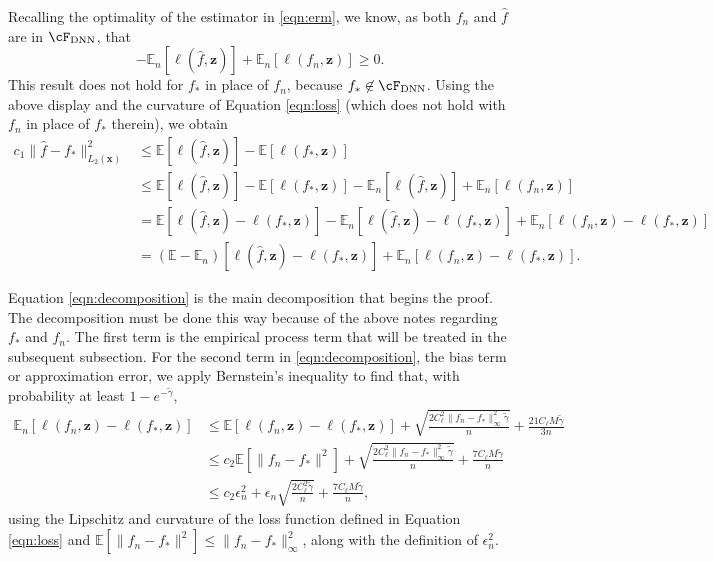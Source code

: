 \documentclass[11pt]{article}
\numberwithin{equation}{section}
\theoremstyle{definition}
\newcommand{\E}{\mathbb{E}}
\newcommand{\bz}{\bm{z}}
\newcommand{\bx}{\bm{x}}
\newcommand{\gt}{\tilde{\gamma}}
\begin{document}
\begin{appendices}
	
	Recalling the optimality of the estimator in \eqref{eqn:erm}, we know, as both $f_n$ and $\hat{f}$ are in $\cF_{\rm DNN}$, that
	\[
		 - \E_n [\ell(\hat{f}, \bz)] + \E_n[ \ell(f_n, \bz)]  \geq 0.
	\]
	This result does not hold for $f_*$ in place of $f_n$, because $f_* \not\in \cF_{\rm DNN}$. Using the above display and the curvature of Equation \eqref{eqn:loss} (which does not hold with $f_n$ in place of $f_*$ therein), we obtain
	\begin{align}
		c_1 \| \hat{f} - f_* \|_{L_2(\bx)}^2 & \leq \E [\ell(\hat{f}, \bz)] - \E [\ell(f_*, \bz)] \nonumber \\
		& \leq \E [\ell(\hat{f}, \bz)] - \E [\ell(f_*, \bz)] - \E_n [\ell(\hat{f}, \bz)] + \E_n [\ell(f_n, \bz)] \nonumber \\
		& = \E \left[ \ell(\hat{f}, \bz) - \ell(f_*, \bz) \right] - \E_n \left[\ell(\hat{f}, \bz) -  \ell(f_*, \bz) \right] + \E_n \left[ \ell(f_n, \bz) - \ell(f_*, \bz) \right] \nonumber \\
		& = \left( \E - \E_n \right)\left[ \ell(\hat{f}, \bz) - \ell(f_*, \bz) \right] + \E_n \left[ \ell(f_n, \bz) - \ell(f_*, \bz) \right]. \label{eqn:decomposition}
	\end{align}

	Equation \eqref{eqn:decomposition} is the main decomposition that begins the proof. The decomposition must be done this way because of the above notes regarding $f_*$ and $f_n$.  The first term is the empirical process term that will be treated in the subsequent subsection. For the second term in \eqref{eqn:decomposition}, the bias term or approximation error, we apply Bernstein's inequality to find that, with probability at least $1 - e^{-\gt}$,
	\begin{align}
		\E_n \left[ \ell(f_n, \bz) - \ell(f_*, \bz) \right] &\leq \E \left[ \ell(f_n, \bz) - \ell(f_*, \bz) \right] + \sqrt{\frac{2C_\ell^2 \| f_n - f_*\|_\infty^2 \gt }{n}} + \frac{21C_\ell M \gt}{3n}   		\nonumber \\
		& \leq c_2 \E \left[ \| f_n - f_* \|^2 \right] + \sqrt{\frac{2C_\ell^2 \| f_n - f_*\|_\infty^2 \gt }{n}} + \frac{7 C_\ell M \gt}{n}   		\nonumber \\
		& \leq c_2 \epsilon_n^2 + \epsilon_n \sqrt{\frac{2C_\ell^2 \gt }{n}} + \frac{7 C_\ell M \gt}{n},   		\label{eqn:bias}
	\end{align}
	using the Lipschitz and curvature of the loss function defined in Equation \eqref{eqn:loss} and $\E \left[\| f_n - f_* \|^2 \right]\leq \| f_n - f_*\|_\infty^2$, along with the definition of $\epsilon_n^2$.


\end{appendices}
\end{document}
